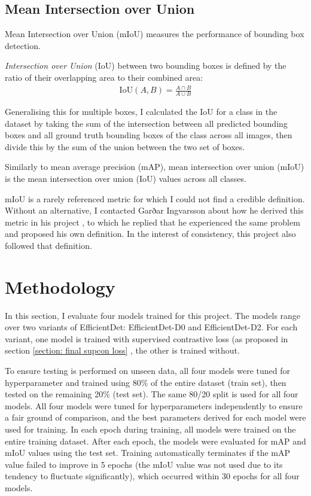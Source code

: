 \documentclass[12pt,a4paper,twoside,openany]{report}
\begin{document}
\subsection{Mean Intersection over Union} \label{section:explain_miou}
Mean Intersection over Union (mIoU) measures the performance of bounding box detection. 

\textit{Intersection over Union} (IoU) between two bounding boxes is defined by the ratio of their overlapping area to their combined area:
\begin{align}
    \text{IoU}(A, B) = \frac{A \cap B}{A \cup B}
\end{align}

Generalising this for multiple boxes, I calculated the IoU for a class in the dataset by taking the sum of the intersection between all predicted bounding boxes and all ground truth bounding boxes of the class across all images, then divide this by the sum of the union between the two set of boxes. 

Similarly to mean average precision (mAP), mean intersection over union (mIoU) is the mean intersection over union (IoU) values across all classes.

mIoU  is a rarely referenced metric for which I could not find a credible definition. Without an alternative, I contacted Garðar Ingvarsson about how he derived this metric in his project \cite{ingvarsson_deep-sea_2022}, to which he replied that he experienced the same problem and proposed his own definition. In the interest of consistency, this project also followed that definition.

\section{Methodology}
In this section, I evaluate four models trained for this project. The models range over two variants of EfficientDet\cite{tan_efficientdet_2020}: EfficientDet-D0 and EfficientDet-D2. For each variant, one model is trained with supervised contrastive loss (as proposed in section \ref{section: final supcon loss} , the other is trained without. 

To ensure testing is performed on unseen data, all four models were tuned for hyperparameter and trained using 80\% of the entire dataset (train set), then tested on the remaining 20\% (test set). The same 80/20 split is used for all four models. All four models were tuned for hyperparameters independently to ensure a fair ground of comparison, and the best parameters derived for each model were used for training. 
In each epoch during training, all models were trained on the entire training dataset. After each epoch, the models were evaluated for mAP and mIoU values using the test set. Training automatically terminates if the mAP value failed to improve in 5 epochs (the mIoU value was not used due to its tendency to fluctuate significantly), which occurred within 30 epochs for all four models.
\end{document}

